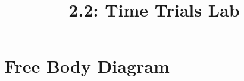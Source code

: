 \documentclass{article}
\title{2.2: Time Trials Lab}
\begin{document}
\section{Free Body Diagram}
\end{document}
